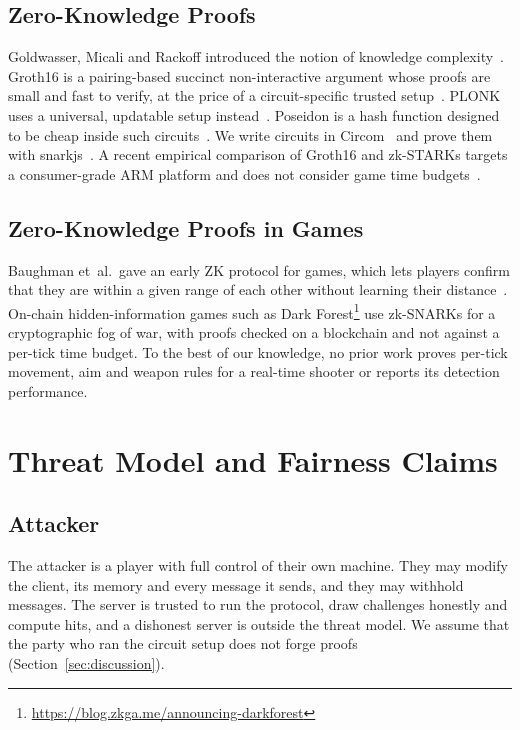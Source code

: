 \documentclass[conference]{IEEEtran}
\begin{document}
\subsection{Zero-Knowledge Proofs}
Goldwasser, Micali and Rackoff introduced the notion of knowledge complexity~\cite{gmr1989}.
Groth16 is a pairing-based succinct non-interactive argument whose proofs are small and fast to verify, at the price of a circuit-specific trusted setup~\cite{groth2016}.
PLONK uses a universal, updatable setup instead~\cite{plonk2019}.
Poseidon is a hash function designed to be cheap inside such circuits~\cite{poseidon2021}.
We write circuits in Circom~\cite{circom2023} and prove them with snarkjs~\cite{snarkjs}.
A recent empirical comparison of Groth16 and zk-STARKs targets a consumer-grade ARM platform and does not consider game time budgets~\cite{nainwal2025}.

\subsection{Zero-Knowledge Proofs in Games}
Baughman et~al.\ gave an early ZK protocol for games, which lets players confirm that they are within a given range of each other without learning their distance~\cite{baughman2007}.
On-chain hidden-information games such as Dark Forest\footnote{\url{https://blog.zkga.me/announcing-darkforest}} use zk-SNARKs for a cryptographic fog of war, with proofs checked on a blockchain and not against a per-tick time budget.
To the best of our knowledge, no prior work proves per-tick movement, aim and weapon rules for a real-time shooter or reports its detection performance.

\section{Threat Model and Fairness Claims}

\subsection{Attacker}
The attacker is a player with full control of their own machine.
They may modify the client, its memory and every message it sends, and they may withhold messages.
The server is trusted to run the protocol, draw challenges honestly and compute hits, and a dishonest server is outside the threat model.
We assume that the party who ran the circuit setup does not forge proofs (Section~\ref{sec:discussion}).
\end{document}
